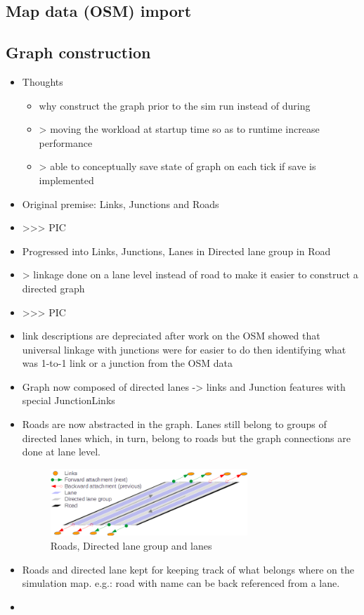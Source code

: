 \subsection{Map data (OSM) import}


\subsection{Graph construction}

\begin{itemize}
	\item Thoughts
	\begin{itemize}
		\item why construct the graph prior to the sim run instead of during	
		\item > moving the workload at startup time so as to runtime increase performance
		\item > able to conceptually save state of graph on each tick if save is implemented
	\end{itemize}
	\item Original premise: Links, Junctions and Roads
	\item >>> PIC
	\item Progressed into Links, Junctions, Lanes in Directed lane group in Road
	\item > linkage done on a lane level instead of road to make it easier to construct a directed graph
	\item >>> PIC
	\item link descriptions are depreciated after work on the OSM showed that universal linkage with junctions were for easier to do then identifying what was 1-to-1 link or a junction from the OSM data
	\item Graph now composed of directed lanes -> links and Junction features with special JunctionLinks
	\item Roads are now abstracted in the graph. Lanes still belong to groups of directed lanes which, in turn, belong to roads but the graph connections are done at lane level.
	
\begin{figure}[h]
	\vspace{1.5em}
  	\caption{Roads, Directed lane group and lanes}
  	\label{fig:RoadsFinal}
  	\centering
	\includegraphics[width=0.70\textwidth]{figs/Roads.png}
  	\vspace{1.5em}
\end{figure}	
	
	\item Roads and directed lane kept for keeping track of what belongs where on the simulation map. e.g.: road with name can be back referenced from a lane.
	\item 
\end{itemize}

